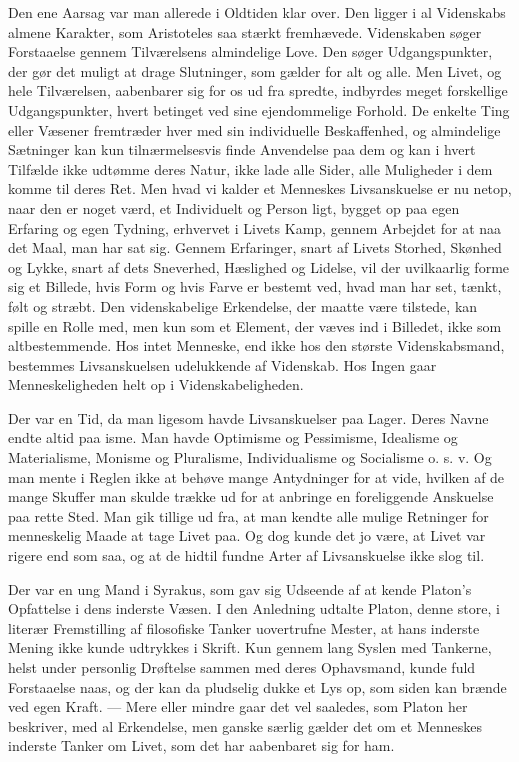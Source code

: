 \documentclass[12pt]{article}
\newcommand{\opage}[1]{\marginnote{\footnotesize\textit{[#1]}}}
\begin{document}
Den ene Aarsag var man allerede i Oldtiden klar over. Den ligger i al
Videnskabs almene Karakter, som Aristoteles saa stærkt fremhævede.
Videnskaben søger Forstaaelse gennem Tilværelsens almindelige Love. Den
søger Udgangspunkter, der gør det muligt at drage Slutninger, som
gælder for alt og alle. Men Livet, og hele Tilværelsen, aabenbarer sig
for os ud fra spredte, indbyrdes meget forskellige Udgangspunkter,
hvert betinget ved sine ejendommelige Forhold. De enkelte Ting eller
Væsener fremtræder hver med sin individuelle Beskaffenhed, og
almindelige Sætninger kan kun tilnærmelsesvis finde Anvendelse paa dem
og kan i hvert Tilfælde ikke udtømme deres Natur, ikke lade alle
Sider, alle Muligheder i dem komme til deres Ret. Men hvad vi kalder
et Menneskes Livsanskuelse er nu netop, naar den er noget værd, et
Individuelt og Person%
\opage{53}ligt, bygget op paa egen Erfaring og egen Tydning, erhvervet
i Livets Kamp, gennem Arbejdet for at naa det Maal, man har sat sig.
Gennem Erfaringer, snart af Livets Storhed, Skønhed og Lykke, snart af
dets Sneverhed, Hæslighed og Lidelse, vil der uvilkaarlig forme sig et
Billede, hvis Form og hvis Farve er bestemt ved, hvad man har set,
tænkt, følt og stræbt. Den videnskabelige Erkendelse, der maatte være
tilstede, kan spille en Rolle med, men kun som et Element, der væves
ind i Billedet, ikke som altbestemmende. Hos intet Menneske, end ikke
hos den største Videnskabsmand, bestemmes Livsanskuelsen udelukkende
af Videnskab. Hos Ingen gaar Menneskeligheden helt op i
Videnskabeligheden.

Der var en Tid, da man ligesom havde Livsanskuelser paa Lager. Deres
Navne endte altid paa isme. Man havde Optimisme og Pessimisme,
Idealisme og Materialisme, Monisme og Pluralisme, Individualisme og
Socialisme o. s. v. Og man mente i Reglen ikke at behøve mange
Antydninger for at vide, hvilken af de mange Skuffer man skulde trække
ud for at anbringe en foreliggende Anskuelse paa rette Sted. Man gik
tillige ud fra, at man kendte alle mulige Retninger for menneskelig
Maade at tage Livet paa. Og dog kunde det jo være, at Livet var rigere
end som saa, og at de hidtil fundne Arter af Livsanskuelse ikke slog
til.

Der var en ung Mand i Syrakus, som gav sig Udseende af at kende
Platon's Opfattelse i dens inderste Væsen. I den Anledning udtalte
Platon, denne store, i literær Fremstilling af filosofiske Tanker
uovertrufne Mester, at hans inderste Mening ikke kunde udtrykkes i
Skrift. Kun gennem lang Syslen med Tankerne, helst under personlig
Drøftelse sammen med deres Ophavsmand, kunde fuld
\opage{54}Forstaaelse naas, og der kan da pludselig dukke et Lys op,
som siden kan brænde ved egen Kraft. --- Mere eller mindre gaar det
vel saaledes, som Platon her beskriver, med al Erkendelse, men ganske
særlig gælder det om et Menneskes inderste Tanker om Livet, som det
har aabenbaret sig for ham.
\end{document}
